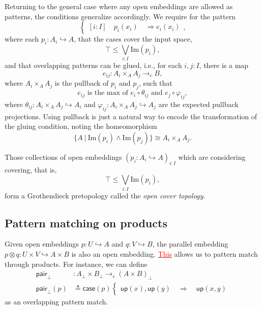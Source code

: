 \documentclass[conference]{IEEEtran}
\newcommand{\hookto}{\hookrightarrow}
\newcommand{\cto}{\to_c}
\newcommand{\suchthat}{\ |\ }
\newcommand{\Img}[1]{\text{Im}\left({#1}\right)}
\newcommand{\Branch}{\Rightarrow}
\newcommand{\up}{\mathsf{up}}
\newcommand{\isthemaxof}[3]{{#1}\text{ is the max of }{#2}\text{ and }{#3}}
\newcommand{\grammar}[1]{\textcolor{red}{\underline{#1}}}
\begin{document}
Returning to the general case where any open embeddings are allowed as patterns, the conditions generalize accordingly. We require for the pattern
\[
\begin{cases}
[i : I] \quad p_i(x_i) \quad \Branch e_i(x_i)
\end{cases},
\]
where each $p_i : A_i \hookto A$, that the cases cover the input space,
\[
\top \le \bigvee_{i : I} \Img{p_i}, \tag{covering}
\]
and that overlapping patterns can be glued, i.e., for each $i, j : I$, there is a map
\[
e_{ij} : A_i \times_A A_j \cto B,
\]
where $A_i \times_A A_j$ is the pullback of $p_i$ and $p_j$, such that 
\[
\isthemaxof{ e_{ij} }{ e_i \circ \theta_{ij}}{ e_j \circ \varphi_{ij}}, \tag{gluing}
\]
where $\theta_{ij} : A_i \times_A A_j \hookto A_i$ and $\varphi_{ij} : A_i \times_A A_j \hookto A_j$ are the expected pullback projections. Using pullback is just a natural way to encode the transformation of the gluing condition, noting the homeomorphism
\[
 \{A \suchthat \Img{p_i} \wedge \Img{p_j} \} \cong A_i \times_A A_j.
\]

Those collections of open embeddings $\left( p_i : A_i \hookto A \right)_{i : I}$ which are considering covering, that is,
\[
\top \le \bigvee_{i : I} \Img{p_i},
\]
form a Grothendieck pretopology called the \emph{open cover topology}.

\subsection{Pattern matching on products}

Given open embeddings $p : U \hookto A$ and $q : V \hookto B$, the parallel embedding $p \otimes q : U \times V \hookto A \times B$ is also an open embedding. \grammar{This} allows us to pattern match through products. 
For instance, we can define
\begin{align*}
 \mathsf{pair}_\bot &: A_\bot \times B_\bot \cto \left( A \times B \right)_\bot
\\ \mathsf{pair}_\bot(p) &\triangleq \mathsf{case}(p)
\begin{cases}
\up(x) , \up(y)
  \quad \Branch \quad \up(x, y)
\end{cases}
\end{align*}
as an overlapping pattern match.
\end{document}
